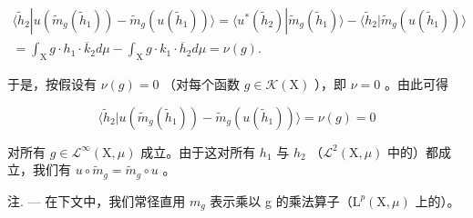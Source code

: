 \[
\begin{array}{c} \langle \widetilde {h} _ {2} | u (\widetilde {m} _ {g} (\widetilde {h} _ {1})) - \widetilde {m} _ {g} (u (\widetilde {h} _ {1})) \rangle = \langle u ^ {*} (\widetilde {h} _ {2}) | \widetilde {m} _ {g} (\widetilde {h} _ {1}) \rangle - \langle \widetilde {h} _ {2} | \widetilde {m} _ {g} (u (\widetilde {h} _ {1})) \rangle \\ = \int_ {\mathrm{X}} g \cdot h _ {1} \cdot \overline {{k}} _ {2} d \mu - \int_ {\mathrm{X}} g \cdot k _ {1} \cdot \overline {{h}} _ {2} d \mu = \nu (g). \end{array}
\]

于是，按假设有 \(\nu(g) = 0\) （对每个函数 \(g \in \mathcal{K}(\mathrm{X})\) ），即 \(\nu = 0\) 。由此可得

\[
\langle \widetilde {h} _ {2} | u (\widetilde {m} _ {g} (\widetilde {h} _ {1})) - \widetilde {m} _ {g} (u (\widetilde {h} _ {1})) \rangle = \nu (g) = 0
\]

对所有 \(g \in \mathcal{L}^{\infty}(\mathrm{X},\mu)\) 成立。由于这对所有 \(h_1\) 与 \(h_2\) （\(\mathcal{L}^2 (\mathrm{X},\mu)\) 中的）都成立，我们有 \(u\circ \widetilde{m}_g = \widetilde{m}_g\circ u\) 。

注. --- 在下文中，我们常径直用 \(m_{g}\) 表示乘以 g 的乘法算子（\(\mathrm{L}^{p}(\mathrm{X},\mu)\) 上的）。

